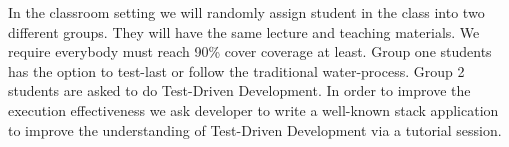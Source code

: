 In the classroom setting we will randomly assign student in the class into
two different groups. They will have the same lecture and teaching
materials.  We require everybody must reach 90\% cover coverage at least.
Group one students has the option to test-last or follow the traditional
water-process. Group 2 students are asked to do Test-Driven Development. In
order to improve the execution effectiveness we ask developer to write a
well-known stack application to improve the understanding of Test-Driven
Development via a tutorial session.

